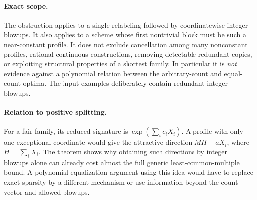 \documentclass[11pt]{article}
\begin{document}
\paragraph{Exact scope.}
The obstruction applies to a single relabeling followed by coordinatewise
integer blowups. It also applies to a scheme whose first nontrivial block
must be such a near-constant profile. It does not exclude cancellation
among many nonconstant profiles, rational continuous constructions,
removing detectable redundant copies, or exploiting structural properties
of a shortest family. In particular it is \emph{not} evidence against a
polynomial relation between the arbitrary-count and equal-count optima.
The input examples deliberately contain redundant integer blowups.

\paragraph{Relation to positive splitting.}
For a fair family, its reduced signature is
$\exp(\sum_i c_iX_i)$. A profile with only one exceptional coordinate
would give the attractive direction $MH+aX_i$, where $H=\sum_iX_i$.
The theorem shows why obtaining such directions by integer blowups alone
can already cost almost the full generic least-common-multiple bound.
A polynomial equalization argument using this idea would have to replace
exact sparsity by a different mechanism or use information beyond the
count vector and allowed blowups.
\end{document}
